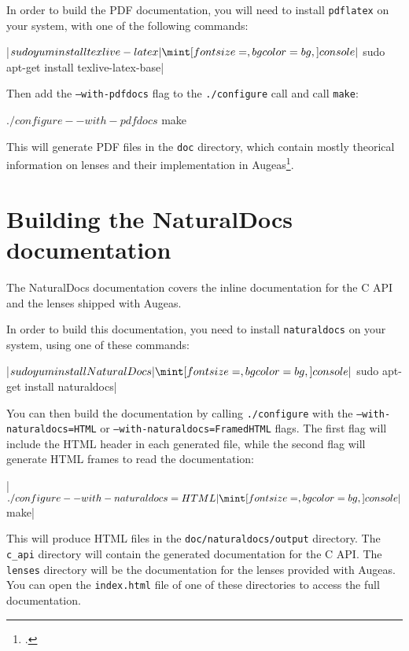 In order to build the PDF documentation, you will need to install \verb!pdflatex! on your system, with one of the following commands:
\nopagebreak

\consolecode|$ sudo yum install texlive-latex|
\consolecode|$ sudo apt-get install texlive-latex-base|

Then add the \texttt{--with\allowbreak-pdfdocs} flag to the \texttt{./configure} call and call \texttt{make}:
\nopagebreak

\begin{console}[]
$ ./configure --with-pdfdocs
$ make
\end{console}

This will generate PDF files in the \verb!doc! directory, which contain mostly theorical information on lenses and their implementation in Augeas\footnote{.}.


\section{Building the NaturalDocs documentation}

The NaturalDocs documentation covers the inline documentation for the C API and the lenses shipped with Augeas.


In order to build this documentation, you need to install \verb!naturaldocs! on your system, using one of these commands:

\consolecode|$ sudo yum install NaturalDocs|
\consolecode|$ sudo apt-get install naturaldocs|

You can then build the documentation by calling \texttt{./configure} with the \texttt{--with\allowbreak-naturaldocs=HTML} or \texttt{--with\allowbreak-naturaldocs=FramedHTML} flags. The first flag will include the HTML header in each generated file, while the second flag will generate HTML frames to read the documentation:
\nopagebreak

\consolecode|$ ./configure --with-naturaldocs=HTML|
\consolecode|$ make|

This will produce HTML files in the \verb!doc/naturaldocs/output! directory. The \verb!c_api! directory will contain the generated documentation for the C API. The \verb!lenses! directory will be the documentation for the lenses provided with Augeas. You can open the \verb!index.html! file of one of these directories to access the full documentation.


